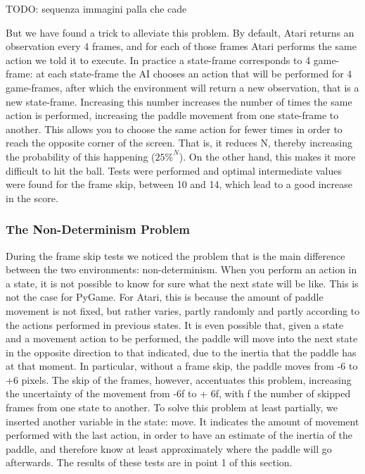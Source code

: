 \smallskip
TODO: sequenza immagini palla che cade
\smallskip

But we have found a trick to alleviate this problem. By default, Atari returns
an observation every 4 frames, and for each of those frames Atari performs the
same action we told it to execute. In practice a state-frame corresponds to 4
game-frame: at each state-frame the AI chooses an action that will be performed
for 4 game-frames, after which the environment will return a new observation,
that is a new state-frame. Increasing this number increases the number of times
the same action is performed, increasing the paddle movement from one
state-frame to another. This allows you to choose the same action for fewer
times in order to reach the opposite corner of the screen. That is, it
reduces N, thereby increasing the probability of this happening ($25\%^{N}$).
On the other hand, this makes it more difficult to hit the ball. Tests were
performed and optimal intermediate values were found for the frame skip,
between 10 and 14, which lead to a good increase in the score.

\subsubsection{The Non-Determinism Problem}

During the frame skip tests we noticed the problem that is the main difference between the two environments: non-determinism. When you perform an action in a state, it is not possible to know for sure what the next state will be like. This is not the case for PyGame. For Atari, this is because the amount of paddle movement is not fixed, but rather varies, partly randomly and partly according to the actions performed in previous states. It is even possible that, given a state and a movement action to be performed, the paddle will move into the next state in the opposite direction to that indicated, due to the inertia that the paddle has at that moment. In particular, without a frame skip, the paddle moves from -6 to +6 pixels. The skip of the frames, however, accentuates this problem, increasing the uncertainty of the movement from -6f to + 6f, with f the number of skipped frames from one state to another. To solve this problem at least partially, we inserted another variable in the state: move. It indicates the amount of movement performed with the last action, in order to have an estimate of the inertia of the paddle, and therefore know at least approximately where the paddle will go afterwards. The results of these tests are in point 1 of this section.

